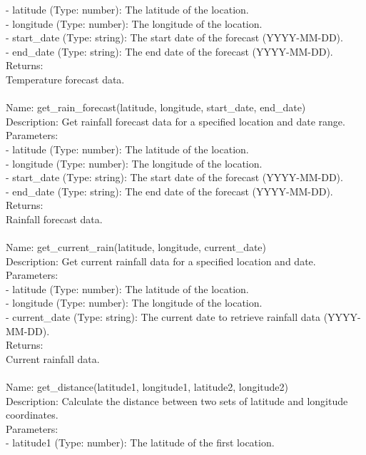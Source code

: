 \begin{tcolorbox}[breakable,title=Prompt Details for Weather]
- latitude (Type: number): The latitude of the location.\\
- longitude (Type: number): The longitude of the location.\\
- start\_date (Type: string): The start date of the forecast (YYYY-MM-DD).\\
- end\_date (Type: string): The end date of the forecast (YYYY-MM-DD).\\
Returns:\\
Temperature forecast data.\\
\\
Name: get\_rain\_forecast(latitude, longitude, start\_date, end\_date)\\
Description: Get rainfall forecast data for a specified location and date range.\\
Parameters:\\
- latitude (Type: number): The latitude of the location.\\
- longitude (Type: number): The longitude of the location.\\
- start\_date (Type: string): The start date of the forecast (YYYY-MM-DD).\\
- end\_date (Type: string): The end date of the forecast (YYYY-MM-DD).\\
Returns:\\
Rainfall forecast data.\\
\\
Name: get\_current\_rain(latitude, longitude, current\_date)\\
Description: Get current rainfall data for a specified location and date.\\
Parameters:\\
- latitude (Type: number): The latitude of the location.\\
- longitude (Type: number): The longitude of the location.\\
- current\_date (Type: string): The current date to retrieve rainfall data (YYYY-MM-DD).\\
Returns:\\
Current rainfall data.\\
\\
Name: get\_distance(latitude1, longitude1, latitude2, longitude2)\\
Description: Calculate the distance between two sets of latitude and longitude coordinates.\\
Parameters:\\
- latitude1 (Type: number): The latitude of the first location.\\

\end{tcolorbox}
